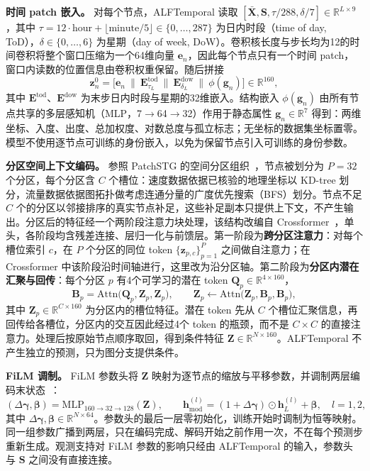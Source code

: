 \textbf{时间 patch 嵌入。} 对每个节点，ALFTemporal 读取 $[\bar{\mathbf{X}},\mathbf{S},\tau/288,\delta/7]\in\mathbb{R}^{L\times9}$，其中 $\tau=12\cdot\text{hour}+\lfloor\text{minute}/5\rfloor\in\{0,\dots,287\}$ 为日内时段（time of day, ToD），$\delta\in\{0,\dots,6\}$ 为星期（day of week, DoW）。卷积核长度与步长均为12的时间卷积将整个窗口压缩为一个64维向量 $\mathbf{e}_n$，因此每个节点只有一个时间 patch，窗口内读数的位置信息由卷积权重保留。随后拼接
\begin{equation}\label{eq:10}
\mathbf{z}^{0}_n=\big[\mathbf{e}_n\ \|\ \mathbf{E}^{\mathrm{tod}}_{\tau_L}\ \|\ \mathbf{E}^{\mathrm{dow}}_{\delta_L}\ \|\ \phi(\mathbf{g}_n)\big]\in\mathbb{R}^{160},
\end{equation}
其中 $\mathbf{E}^{\mathrm{tod}}$、$\mathbf{E}^{\mathrm{dow}}$ 为末步日内时段与星期的32维嵌入。结构嵌入 $\phi(\mathbf{g}_n)$ 由所有节点共享的多层感知机（MLP，7$\to$64$\to$32）作用于静态属性 $\mathbf{g}_n\in\mathbb{R}^7$ 得到：两维坐标、入度、出度、总加权度、对数总度与孤立标志；无坐标的数据集坐标置零。模型不使用逐节点可训练的身份嵌入，以免为保留节点引入可训练的身份参数。

\textbf{分区空间上下文编码。} 参照 PatchSTG 的空间分区组织~\citep{fang2025efficient}，节点被划分为 $P=32$ 个分区，每个分区含 $C$ 个槽位：速度数据依据已核验的地理坐标以 KD-tree 划分，流量数据依据图拓扑做考虑连通分量的广度优先搜索（BFS）划分。节点不足 $C$ 个的分区以邻接排序的真实节点补足，这些补足副本只提供上下文，不产生输出。分区后的特征经一个两阶段注意力块处理，该结构改编自 Crossformer~\citep{zhang2023crossformer}，单头，各阶段均含残差连接、层归一化与前馈层。第一阶段为\textbf{跨分区注意力}：对每个槽位索引 $c$，在 $P$ 个分区的同位 token $\{\mathbf{z}_{p,c}\}_{p=1}^{P}$ 之间做自注意力；在 Crossformer 中该阶段沿时间轴进行，这里改为沿分区轴。第二阶段为\textbf{分区内潜在汇聚与回传}：每个分区 $p$ 有4个可学习的潜在 token $\mathbf{Q}_p\in\mathbb{R}^{4\times160}$，
\begin{equation}\label{eq:11}
\mathbf{B}_p=\mathrm{Attn}\big(\mathbf{Q}_p,\mathbf{Z}_p,\mathbf{Z}_p\big),\qquad
\mathbf{Z}_p\leftarrow\mathrm{Attn}\big(\mathbf{Z}_p,\mathbf{B}_p,\mathbf{B}_p\big),
\end{equation}
其中 $\mathbf{Z}_p\in\mathbb{R}^{C\times160}$ 为分区内的槽位特征。潜在 token 先从 $C$ 个槽位汇聚信息，再回传给各槽位，分区内的交互因此经过4个 token 的瓶颈，而不是 $C\times C$ 的直接注意力。处理后按原始节点顺序取回，得到条件特征 $\mathbf{Z}\in\mathbb{R}^{N\times160}$。ALFTemporal 不产生独立的预测，只为图分支提供条件。

\textbf{FiLM 调制。} FiLM 参数头将 $\mathbf{Z}$ 映射为逐节点的缩放与平移参数，并调制两层编码末状态~\citep{perez2018film}：
\begin{equation}\label{eq:12}
(\Delta\boldsymbol{\gamma},\boldsymbol{\beta})=\mathrm{MLP}_{160\to32\to128}(\mathbf{Z}),\qquad
\mathbf{h}^{(l)}_{\mathrm{mod}}=(1+\Delta\boldsymbol{\gamma})\odot\mathbf{h}^{(l)}_L+\boldsymbol{\beta},\quad l=1,2,
\end{equation}
其中 $\Delta\boldsymbol{\gamma},\boldsymbol{\beta}\in\mathbb{R}^{N\times64}$。参数头的最后一层零初始化，训练开始时调制为恒等映射。同一组参数广播到两层，只在编码完成、解码开始之前作用一次，不在每个预测步重新生成。观测支持对 FiLM 参数的影响只经由 ALFTemporal 的输入，参数头与 $\mathbf{S}$ 之间没有直接连接。

